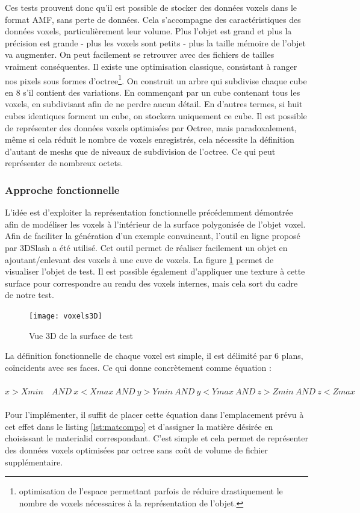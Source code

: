 \documentclass{tnreport}
\begin{document}
Ces tests prouvent donc qu'il est possible de stocker des données voxels dans le format AMF, sans perte de données. Cela s'accompagne des caractéristiques des données voxels, particulièrement leur volume. Plus l'objet est grand et plus la précision est grande - plus les voxels sont petits - plus la taille mémoire de l'objet va augmenter. On peut facilement se retrouver avec des fichiers de tailles vraiment conséquentes. Il existe une optimisation classique, consistant à ranger nos pixels sous formes d'octree\footnote{optimisation de l'espace permettant parfois de réduire drastiquement le nombre de voxels nécessaires à la représentation de l'objet.}. On construit un arbre qui subdivise chaque cube en 8 s'il contient des variations. En commençant par un cube contenant tous les voxels, en subdivisant afin de ne perdre aucun détail. En d'autres termes, si huit cubes identiques forment un cube, on stockera uniquement ce cube. Il est possible de représenter des données voxels optimisées par Octree, mais paradoxalement, même si cela réduit le nombre de voxels enregistrés, cela nécessite la définition d'autant de meshs que de niveaux de subdivision de l'octree. Ce qui peut représenter de nombreux octets.   

\subsubsection{Approche fonctionnelle}
L'idée est d'exploiter la représentation fonctionnelle précédemment démontrée afin de modéliser les voxels à l'intérieur de la surface polygonisée de l'objet voxel.
Afin de faciliter la génération d'un exemple convaincant, l'outil en ligne proposé par 3DSlash\cite{3DSlash} a été utilisé. Cet outil permet de réaliser facilement un objet en ajoutant/enlevant des voxels à une cuve de voxels. La figure \ref{fig:voxels3D} permet de visualiser l'objet de test. Il est possible également d'appliquer une texture à cette surface pour correspondre au rendu des voxels internes, mais cela sort du cadre de notre test. 
\begin{figure}[h]
  \centering
  \texttt{[image: voxels3D]}
  \caption{Vue 3D de la surface de test}
  \label{fig:voxels3D}
\end{figure}

La définition fonctionnelle de chaque voxel est simple, il est délimité par 6 plans, coïncidents avec ses faces. Ce qui donne concrètement comme équation :\\
\\
$x>Xmin\quad AND\ x<Xmax\ AND\ y>Ymin\ AND\ y<Ymax\ AND\ z>Zmin\ AND\ z<Zmax$ \\
\\
Pour l'implémenter, il suffit de placer cette équation dans l'emplacement prévu à cet effet dans le listing \ref{lst:matcompo} et d'assigner la matière désirée en choisissant le materialid correspondant. C'est simple et cela permet de représenter des données voxels optimisées par octree sans coût de volume de fichier supplémentaire. 
\end{document}
